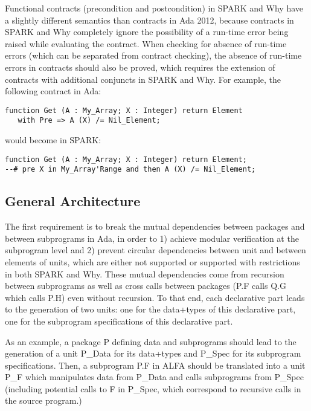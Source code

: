 \documentclass{article}
\begin{document}
Functional contracts (precondition and postcondition) in SPARK and Why have a
slightly different semantics than contracts in Ada 2012, because contracts in
SPARK and Why completely ignore the possibility of a run-time error being
raised while evaluating the contract. When checking for absence of run-time
errors (which can be separated from contract checking), the absence of run-time
errors in contracts should also be proved, which requires the extension of
contracts with additional conjuncts in SPARK and Why. For example, the
following contract in Ada:

\begin{verbatim}
function Get (A : My_Array; X : Integer) return Element
   with Pre => A (X) /= Nil_Element;
\end{verbatim}

would become in SPARK:

\begin{verbatim}
function Get (A : My_Array; X : Integer) return Element;
--# pre X in My_Array'Range and then A (X) /= Nil_Element;
\end{verbatim}

\subsection{General Architecture}

The first requirement is to break the mutual dependencies between packages and
between subprograms in Ada, in order to 1) achieve modular verification at the
subprogram level and 2) prevent circular dependencies between unit and between
elements of units, which are either not supported or supported with
restrictions in both SPARK and Why. These mutual dependencies come from
recursion between subprograms as well as cross calls between packages (P.F
calls Q.G which calls P.H) even without recursion. To that end, each
declarative part leads to the generation of two units: one for the data+types
of this declarative part, one for the subprogram specifications of this
declarative part.

As an example, a package P defining data and subprograms should lead to the
generation of a unit P\_Data for its data+types and P\_Spec for its subprogram
specifications. Then, a subprogram P.F in ALFA should be translated into a unit
P\_F which manipulates data from P\_Data and calls subprograms from P\_Spec
(including potential calls to F in P\_Spec, which correspond to recursive calls
in the source program.)
\end{document}

